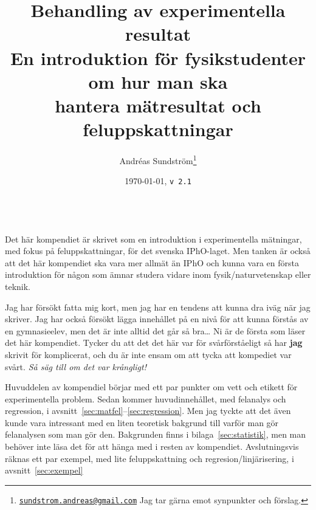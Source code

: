 \documentclass[11pt,a4paper, swedish
]{article}
\newcounter{exempel_counter}%
\begin{document}
\title{\huge Behandling av experimentella resultat\\[2mm] 
\Large En introduktion för fysikstudenter om hur man ska\\ hantera
mätresultat och feluppskattningar}
\author{
Andréas Sundström\footnote{
\href{mailto:sundstrom.andreas@gmail.com}{\nolinkurl{sundstrom.andreas@gmail.com}}
\: Jag tar gärna emot synpunkter och förslag.}
}
\date{\today, \quad\texttt{v\,2.1}}
\maketitle




\\[1mm]
\small
Det här kompendiet är skrivet som en introduktion i experimentella
mätningar, med fokus på feluppskattningar, för det svenska
IPhO-laget. Men tanken är också att det här kompendiet ska vara mer
allmät än IPhO och kunna vara en första introduktion för någon som
ämnar studera vidare inom fysik/naturvetenskap eller teknik. 

Jag har försökt fatta mig kort, men jag har en tendens att
kunna dra iväg när jag skriver. Jag har också försökt lägga innehållet
på en nivå för att kunna förstås av en gymnasieelev, men det är inte
alltid det går så bra\ldots{} Ni är de första som läser det här
kompendiet. Tycker du att det det här var för svårförståeligt så har
\textbf{jag} skrivit för komplicerat, och du är inte ensam om att
tycka att kompediet var svårt. \emph{Så säg till om det var krångligt!} 

Huvuddelen av kompendiel börjar med ett par punkter om vett och
etikett för experimentella problem. 
Sedan kommer huvudinnehållet, med felanalys och regression, i
avsnitt~\ref{sec:matfel}--\ref{sec:regression}. 
Men jag tyckte att det även kunde vara intressant med en liten
teoretisk bakgrund till varför man gör felanalysen som man gör
den. Bakgrunden finns i bilaga~\ref{sec:statistik}, men man behöver
inte läsa det för att hänga med i resten av kompendiet.
Avslutningsvis räknas ett par exempel, med lite feluppskattning och
regresion/linjärisering, i avsnitt~\ref{sec:exempel}
\end{document}
